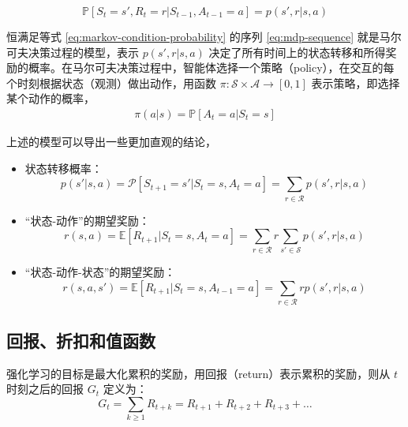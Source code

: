 \begin{equation}
    \mathbb{P}[S_t = s', R_t = r| S_{t-1}, A_{t-1} = a] = p(s', r | s, a)
    \label{eq:markov-condition-probability}
\end{equation}

恒满足等式 \ref{eq:markov-condition-probability} 的序列 \ref{eq:mdp-sequence} 就是马尔可夫决策过程的模型，表示 $p(s', r | s, a)$ 决定了所有时间上的状态转移和所得奖励的概率。在马尔可夫决策过程中，智能体选择一个策略（policy），在交互的每个时刻根据状态（观测）做出动作，用函数 $\pi : \mathcal{S} \times \mathcal{A} \rightarrow [0, 1]$ 表示策略，即选择某个动作的概率，
\begin{equation}
        \begin{split}
            \pi(a|s) = \mathbb{P} [A_t = a | S_t = s]
        \end{split}
\end{equation}

上述的模型可以导出一些更加直观的结论，
\begin{itemize}
    \item 状态转移概率：
    \begin{equation}
        p(s'|s, a) = \mathcal{P}[S_{t+1} = s' | S_{t} = s, A_{t} = a] = \sum_{r\in \mathcal{R}} p(s', r|s, a)
    \end{equation}
    \item “状态-动作”的期望奖励：
    \begin{equation}
        r(s, a) = \mathbb{E} [R_{t+1} | S_{t} = s, A_{t} = a] = \sum_{r\in \mathcal{R}} r \sum_{s' \in \mathcal{S}} p(s', r | s, a)
    \end{equation}
    \item “状态-动作-状态”的期望奖励：
    \begin{equation}
        r(s, a, s') = \mathbb{E} [R_{t+1} | S_{t} = s, A_{t-1} = a] = \sum_{r\in \mathcal{R}} r p(s', r | s, a)
    \end{equation}
\end{itemize}


\subsection{回报、折扣和值函数}
强化学习的目标是最大化累积的奖励，用回报（return）表示累积的奖励，则从 $t$ 时刻之后的回报 $G_t$ 定义为：
\begin{equation}
    G_t = \sum_{k \geq 1} R_{t+k} = R_{t+1} + R_{t+2} + R_{t+3} + \dots
\end{equation}

